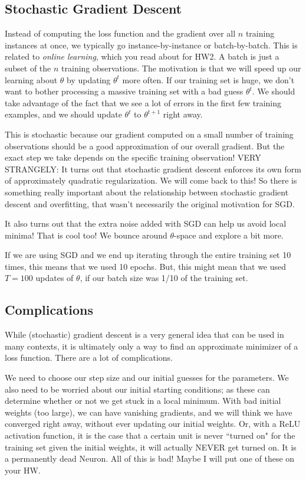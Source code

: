 \subsection{Stochastic Gradient Descent}

Instead of computing the loss function and the gradient over all $n$ training instances at once, we typically go instance-by-instance or batch-by-batch. This is related to \emph{online learning}, which you read about for HW2. A batch is just a subset of the $n$ training observations. The motivation is that we will speed up our learning about $\theta$ by updating $\theta^{t}$ more often. If our training set is huge, we don't want to bother processing a massive training set with a bad guess $\theta^{t}$. We should take advantage of the fact that we see a lot of errors in the first few training examples, and we should update $\theta^{t}$ to $\theta^{t+1}$ right away. 

This is stochastic because our gradient computed on a small number of training observations should be a good approximation of our overall gradient. But the exact step we take depends on the specific training observation! VERY STRANGELY: It turns out that stochastic gradient descent enforces its own form of approximately quadratic regularization. We will come back to this! So there is something really important about the relationship between stochastic gradient descent and overfitting, that wasn't necessarily the original motivation for SGD. 

It also turns out that the extra noise added with SGD can help us avoid local minima! That is cool too! We bounce around $\theta$-space and explore a bit more. 

If we are using SGD and we end up iterating through the entire training set 10 times, this means that we used 10 epochs. But, this might mean that we used $T=100$ updates of $\theta$, if our batch size was 1/10 of the training set. 

\subsection{Complications}

While (stochastic) gradient descent is a very general idea that can be used in many contexts, it is ultimately only a way to find an approximate minimizer of a loss function. There are a lot of complications.

We need to choose our step size and our initial guesses for the parameters. We also need to be worried about our initial starting conditions; as these can determine whether or not we get stuck in a local minimum. With bad initial weights (too large), we can have vanishing gradients, and we will think we have converged right away, without ever updating our initial weights. Or, with a ReLU activation function, it is the case that a certain unit is never ``turned on" for the training set given the initial weights, it will actually NEVER get turned on. It is a permanently dead Neuron. All of this is bad! Maybe I will put one of these on your HW. 

